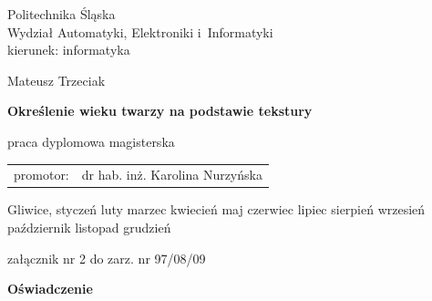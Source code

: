 \documentclass[a4paper,twoside,12pt]{book}
\newcommand{\miesiac}{%
\ifcase\the\month
\or styczeń%
\or luty%
\or marzec%
\or kwiecień%
\or maj%
\or czerwiec%
\or lipiec%
\or sierpień%
\or wrzesień%
\or październik%
\or listopad%
\or grudzień%
\fi}
\newcommand{\autor}{Mateusz Trzeciak}
\newcommand{\promotor}{dr hab. inż. Karolina Nurzyńska}
\newcommand{\tytul}{Określenie wieku twarzy na podstawie tekstury}
\begin{document}

    \pagestyle{empty}
    \sffamily

    \noindent

    \begin{center}
        \large
        Politechnika Śląska\\
        Wydział Automatyki, Elektroniki i~Informatyki \\
        kierunek: informatyka
    \end{center}

    \vfill\vfill
    \begin{center}
        \large
        \autor
    \end{center}

    \vfill
    \begin{center}
        \LARGE\bfseries \tytul
    \end{center}

    \vfill
    \begin{center}
        \large
        praca dyplomowa magisterska
    \end{center}

    \vfill\vfill\vfill
    \begin{center}
        \large
        \begin{tabular}{ll}
            promotor: & \promotor \\
        \end{tabular}

    \end{center}

    \vfill
    \begin{center}
        \large
        Gliwice,  \miesiac\ \the\year
    \end{center}

    \cleardoublepage


    \rmfamily
    \normalfont

    \cleardoublepage

    \begin{flushright}
        załącznik nr 2 do zarz. nr 97/08/09
    \end{flushright}

    \vfill

    \begin{center}
        \Large\bfseries Oświadczenie
    \end{center}
\end{document}
